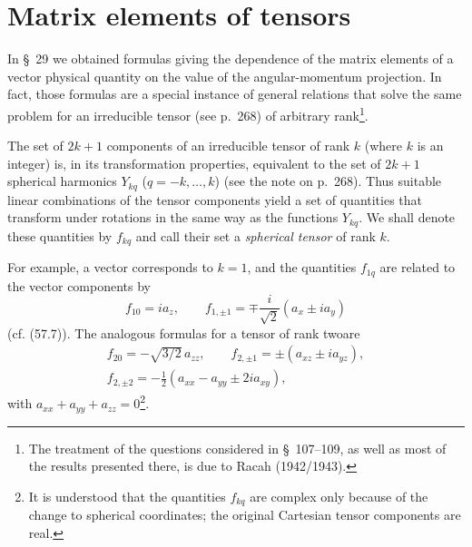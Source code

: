 \section{Matrix elements of tensors}

In \S~29 we obtained formulas giving the dependence of the matrix elements of a vector physical quantity on the value of the angular-momentum projection. In fact, those formulas are a special instance of general relations that solve the same problem for an irreducible tensor (see p.~268) of arbitrary rank\footnote{The treatment of the questions considered in \S~107--109, as well as most of the results presented there, is due to Racah (1942/1943).}.

The set of $2k+1$ components of an irreducible tensor of rank $k$ (where $k$ is an integer) is, in its transformation properties, equivalent to the set of $2k+1$ spherical harmonics $Y_{kq}$ ($q=-k,\ldots,k$) (see the note on p.~268). Thus suitable linear combinations of the tensor components yield a set of quantities that transform under rotations in the same way as the functions $Y_{kq}$. We shall denote these quantities by $f_{kq}$ and call their set a \emph{spherical tensor} of rank $k$.

For example, a vector corresponds to $k=1$, and the quantities $f_{1q}$ are related to the vector components by
\begin{equation}
 f_{10}=ia_z,\qquad f_{1,\pm1}=\mp\frac{i}{\sqrt2}(a_x\pm ia_y)
 \tag{107.1}
\end{equation}
(cf. (57.7)). The analogous formulas for a tensor of rank twoare
\begin{equation}
 \begin{gathered}
 f_{20}=-\sqrt{3/2}\,a_{zz},\qquad f_{2,\pm1}=\pm(a_{xz}\pm ia_{yz}),\\
 f_{2,\pm2}=-\frac12(a_{xx}-a_{yy}\pm2ia_{xy}),
 \end{gathered}
 \tag{107.2}
\end{equation}
with $a_{xx}+a_{yy}+a_{zz}=0$\footnote{It is understood that the quantities $f_{kq}$ are complex only because of the change to spherical coordinates; the original Cartesian tensor components are real.}.

